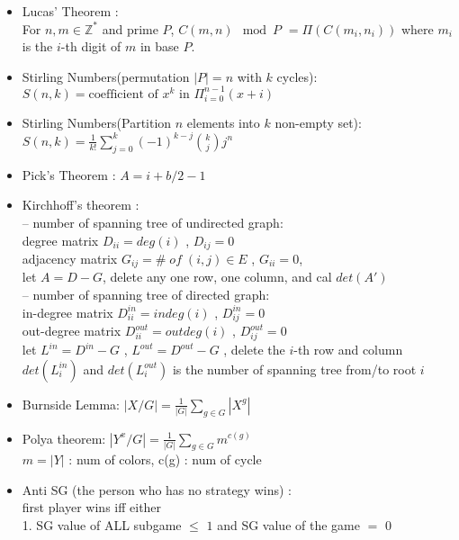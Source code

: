 \begin{itemize}
\item Lucas’ Theorem :\\
  For $n, m \in \mathbb{Z}^{*}$ and prime $P$,
  $C(m,n) \mod P$
	$= \Pi ( C(m_i,n_i) )$
	where $m_i$ is the $i$-th digit of $m$ in base $P$.
\item Stirling Numbers(permutation $|P|=n$ with $k$ cycles): \\
  $S(n,k) = \text{coefficient of }x^k \text{ in } \Pi_{i=0}^{n-1} (x+i)$
\item Stirling Numbers(Partition $n$ elements into $k$ non-empty set): \\
  $S(n,k) = \frac{1}{k!} \sum\limits_{j=0}^k (-1)^{k-j} {k \choose j} j^n$
\item Pick’s Theorem : $A = i + b/2 - 1$
\item Kirchhoff's theorem :\\
  -- number of spanning tree of undirected graph:\\
  degree matrix $D_{ii} = deg(i)$ , $D_{ij} = 0$\\
  adjacency matrix $G_{ij} = \#\;of\;(i,j) \in E$ , $G_{ii} = 0$,\\
  let $A = D - G$, delete any one row, one column, and cal $det(A')$\\
  -- number of spanning tree of directed graph:\\
  in-degree matrix $D_{ii}^{in} = indeg(i)$ , $D_{ij}^{in} = 0$\\
  out-degree matrix $D_{ii}^{out} = outdeg(i)$ , $D_{ij}^{out} = 0$\\
  let $L^{in} = D^{in} - G$ , $L^{out} = D^{out} - G$ , delete the $i$-th row and column\\
  $det(L_i^{in})$ and $det(L_i^{out})$ is the number of spanning tree from/to root $i$\\
\item Burnside Lemma:
  $|X/G|=\frac{1}{|G|}\sum\limits_{g \in G} {|X^g|}$
\item Polya theorem:
  $|Y^x/G|=\frac{1}{|G|}\sum\limits_{g \in G} {m^{c(g)}}$\\
  $m = |Y|$ : num of colors, c(g) : num of cycle
\item Anti SG (the person who has no strategy wins) :\\
  first player wins iff either\\
  1. SG value of ALL subgame $\le$ $1$ and SG value of the game $=$ $0$\\

\end{itemize}
